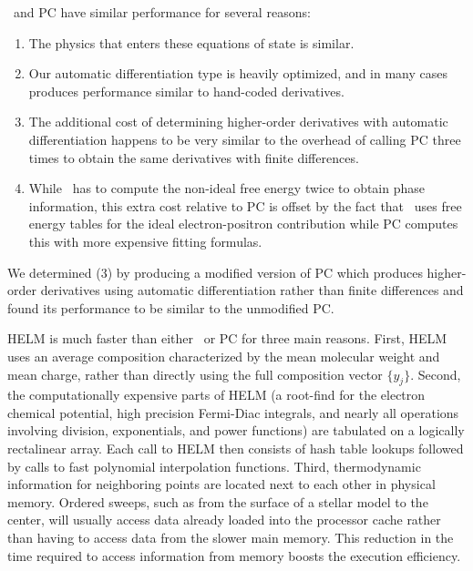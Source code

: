 \skye\ and PC have similar performance for several reasons:
\begin{enumerate}
	\item The physics that enters these equations of state is similar.
	\item Our automatic differentiation type is heavily optimized, and in many cases produces performance similar to hand-coded derivatives.
	\item The additional cost of determining higher-order derivatives with automatic differentiation happens to be very similar to the overhead of calling PC three times to obtain the same derivatives with finite differences.
	\item While \skye\ has to compute the non-ideal free energy twice to obtain phase information, this extra cost relative to PC is offset by the fact that \skye\ uses free energy tables for the ideal electron-positron contribution while PC computes this with more expensive fitting formulas.
\end{enumerate}
We determined (3) by producing a modified version of PC which produces higher-order derivatives using automatic differentiation rather than finite differences and found its performance to be similar to the unmodified PC.

HELM is much faster than either \skye\ or PC for three main reasons.
First, HELM uses an average composition characterized by the mean molecular weight and mean charge, 
rather than directly using the full composition vector $\{y_j\}$.
Second, the computationally expensive parts of HELM (a root-find for the electron chemical potential, 
high precision Fermi-Diac integrals, and nearly all operations involving division, exponentials, and power functions) are tabulated 
on a logically rectalinear array. Each call to HELM then consists of hash table lookups followed 
by calls to fast polynomial interpolation functions.
Third, thermodynamic information for neighboring points are located next to each other in physical memory. 
Ordered sweeps, such as from the surface of a stellar model to the center, 
will usually access data already loaded into the processor cache rather than having to access 
data from the slower main memory. This reduction in the time required to access
information from memory boosts the execution efficiency.


